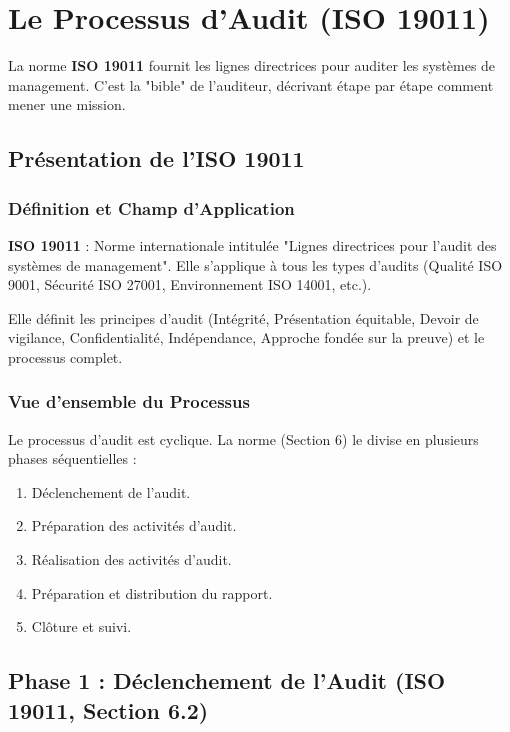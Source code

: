 \chapter{Le Processus d'Audit (ISO 19011)}
\label{chap:procauditb}

La norme \textbf{ISO 19011} fournit les lignes directrices pour auditer les systèmes de management. C'est la "bible" de l'auditeur, décrivant étape par étape comment mener une mission.

\section{Présentation de l'ISO 19011}

\subsection{Définition et Champ d'Application}

\begin{boxdef}
\textbf{ISO 19011} : Norme internationale intitulée "Lignes directrices pour l'audit des systèmes de management". Elle s'applique à tous les types d'audits (Qualité ISO 9001, Sécurité ISO 27001, Environnement ISO 14001, etc.).
\end{boxdef}

Elle définit les principes d'audit (Intégrité, Présentation équitable, Devoir de vigilance, Confidentialité, Indépendance, Approche fondée sur la preuve) et le processus complet.

\subsection{Vue d'ensemble du Processus}

Le processus d'audit est cyclique. La norme (Section 6) le divise en plusieurs phases séquentielles :
\begin{enumerate}
    \item Déclenchement de l'audit.
    \item Préparation des activités d'audit.
    \item Réalisation des activités d'audit.
    \item Préparation et distribution du rapport.
    \item Clôture et suivi.
\end{enumerate}

\section{Phase 1 : Déclenchement de l'Audit (ISO 19011, Section 6.2)}

